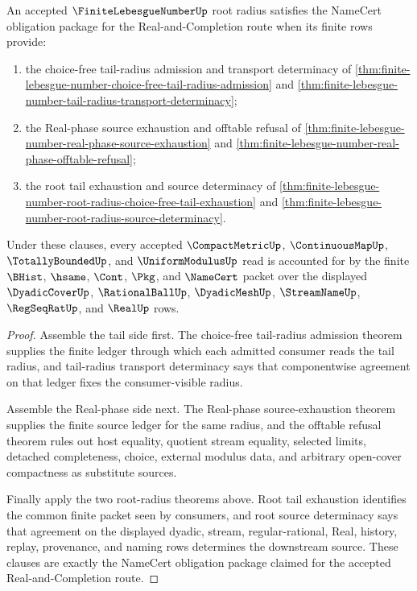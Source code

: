 \begin{theorem}
\label{thm:finite-lebesgue-number-root-radius-namecert-obligation-package}
An accepted $\FiniteLebesgueNumberUp$ root radius satisfies the NameCert obligation package for the Real-and-Completion route when its finite rows provide:
\begin{enumerate}
\item the choice-free tail-radius admission and transport determinacy of \autoref{thm:finite-lebesgue-number-choice-free-tail-radius-admission} and \autoref{thm:finite-lebesgue-number-tail-radius-transport-determinacy};
\item the Real-phase source exhaustion and offtable refusal of \autoref{thm:finite-lebesgue-number-real-phase-source-exhaustion} and \autoref{thm:finite-lebesgue-number-real-phase-offtable-refusal};
\item the root tail exhaustion and source determinacy of \autoref{thm:finite-lebesgue-number-root-radius-choice-free-tail-exhaustion} and \autoref{thm:finite-lebesgue-number-root-radius-source-determinacy}.
\end{enumerate}
Under these clauses, every accepted $\CompactMetricUp$, $\ContinuousMapUp$, $\TotallyBoundedUp$, and $\UniformModulusUp$ read is accounted for by the finite $\BHist$, $\hsame$, $\Cont$, $\Pkg$, and $\NameCert$ packet over the displayed $\DyadicCoverUp$, $\RationalBallUp$, $\DyadicMeshUp$, $\StreamNameUp$, $\RegSeqRatUp$, and $\RealUp$ rows.
\end{theorem}
\begin{proof}
Assemble the tail side first. The choice-free tail-radius admission theorem supplies the finite ledger through which each admitted consumer reads the tail radius, and tail-radius transport determinacy says that componentwise agreement on that ledger fixes the consumer-visible radius.

Assemble the Real-phase side next. The Real-phase source-exhaustion theorem supplies the finite source ledger for the same radius, and the offtable refusal theorem rules out host equality, quotient stream equality, selected limits, detached completeness, choice, external modulus data, and arbitrary open-cover compactness as substitute sources.

Finally apply the two root-radius theorems above. Root tail exhaustion identifies the common finite packet seen by consumers, and root source determinacy says that agreement on the displayed dyadic, stream, regular-rational, Real, history, replay, provenance, and naming rows determines the downstream source. These clauses are exactly the NameCert obligation package claimed for the accepted Real-and-Completion route.
\end{proof}
